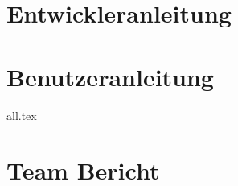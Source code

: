 













\tableofcontents




\texttt{}
\begin{lstlisting}[language=bash, keywords={}]
\end{lstlisting}
\begin{lstlisting}[language={[x86masm]Assembler}]
\end{lstlisting}

\chapter{Entwickleranleitung}
\label{dev}

\chapter{Benutzeranleitung}
\label{user}
{all.tex}

\chapter{Team Bericht}
\label{team}



